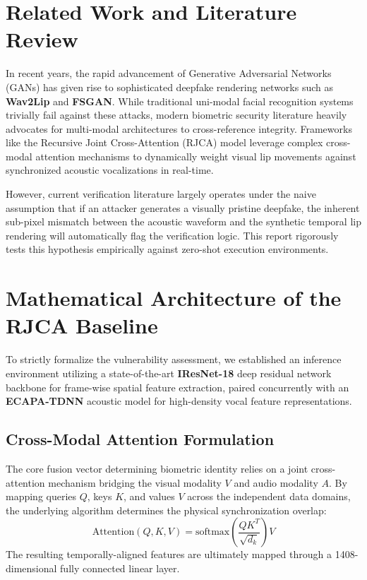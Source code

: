 \documentclass[conference]{IEEEtran}
\begin{document}
\section{Related Work and Literature Review}
In recent years, the rapid advancement of Generative Adversarial Networks (GANs) has given rise to sophisticated deepfake rendering networks such as \textbf{Wav2Lip} and \textbf{FSGAN}. While traditional uni-modal facial recognition systems trivially fail against these attacks, modern biometric security literature heavily advocates for multi-modal architectures to cross-reference integrity. Frameworks like the Recursive Joint Cross-Attention (RJCA) model leverage complex cross-modal attention mechanisms to dynamically weight visual lip movements against synchronized acoustic vocalizations in real-time. 

However, current verification literature largely operates under the naive assumption that if an attacker generates a visually pristine deepfake, the inherent sub-pixel mismatch between the acoustic waveform and the synthetic temporal lip rendering will automatically flag the verification logic. This report rigorously tests this hypothesis empirically against zero-shot execution environments.

\section{Mathematical Architecture of the RJCA Baseline}
To strictly formalize the vulnerability assessment, we established an inference environment utilizing a state-of-the-art \textbf{IResNet-18} deep residual network backbone for frame-wise spatial feature extraction, paired concurrently with an \textbf{ECAPA-TDNN} acoustic model for high-density vocal feature representations.

\subsection{Cross-Modal Attention Formulation}
The core fusion vector determining biometric identity relies on a joint cross-attention mechanism bridging the visual modality $V$ and audio modality $A$. By mapping queries $Q$, keys $K$, and values $V$ across the independent data domains, the underlying algorithm determines the physical synchronization overlap:
\begin{equation}
    \text{Attention}(Q, K, V) = \text{softmax}\left(\frac{QK^T}{\sqrt{d_k}}\right)V
\end{equation}
The resulting temporally-aligned features are ultimately mapped through a 1408-dimensional fully connected linear layer.
\end{document}
